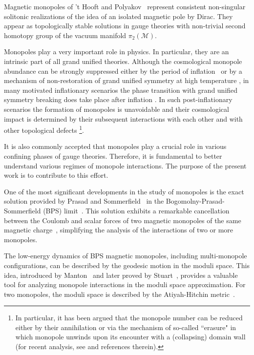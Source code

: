 \documentclass[aps, prd, twocolumn, superscriptaddress, preprintnumbers, nofootinbib, longbibliography]{revtex4-1}
\begin{document}
Magnetic monopoles of 't Hooft and Polyakov~\cite{tHooft:1974kcl, Polyakov:1974ek} represent consistent non-singular 
solitonic realizations of the idea of an isolated magnetic pole 
by Dirac.  They appear as topologically stable solutions in gauge theories with non-trivial second homotopy group of the vacuum manifold $\pi_2(\mathcal{M})$.

Monopoles play a very important role in physics. 
In particular, they are an intrinsic part of all grand unified theories. 
Although the cosmological monopole abundance can be strongly suppressed either by the 
period of inflation~\cite{Guth:1980zm} or by a mechanism of non-restoration of grand unified symmetry at high temperature
\cite{Dvali:1995cj}, in many motivated inflationary scenarios the phase transition with 
grand unified symmetry breaking does take place after inflation \cite{Dvali:1994ms}. In such post-inflationary scenarios the formation of
monopoles is unavoidable and their cosmological impact is determined by their subsequent 
interactions with each other and with other topological defects \footnote{In particular, it has been argued that 
the monopole number can be reduced either by their annihilation \cite{Langacker:1980kd} or 
via the mechanism of so-called ``erasure" \cite{Dvali:1997sa, Dvali:2022rgx} 
in which monopole unwinds upon its encounter with a (collapsing) domain wall (for recent analysis, see \cite{Bachmaier:2023zmq} and references therein).}.   
 
It is also commonly accepted that monopoles play a crucial role in various confining phases of gauge theories.  Therefore, it is fundamental to better understand various regimes of monopole interactions. 
The purpose of the present work is to contribute to this effort. 

 
One of the most significant developments in the study of monopoles is the exact solution provided by Prasad and Sommerfield~\cite{Prasad-Sommerfield:1975} in the Bogomolny-Prasad-Sommerfield (BPS) limit~\cite{Prasad-Sommerfield:1975, Bogomolny:1975de}. This solution exhibits a remarkable cancellation between the Coulomb and scalar forces of two magnetic monopoles of the same magnetic charge~\cite{Manton:1977er}, simplifying 
the analysis of the interactions of two or more monopoles. 

The low-energy dynamics of BPS magnetic monopoles, including multi-monopole configurations, can be described by the geodesic motion in the moduli space. This idea, introduced by Manton~\cite{Manton:1981mp} and later proved by Stuart~\cite{Stuart:1994tc}, provides a valuable tool for analyzing monopole interactions in the moduli space approximation.
For two monopoles, the moduli space is described by the Atiyah-Hitchin metric~\cite{Atiyah:1985dv, Atiyah-Hitchin1988}.
\end{document}
